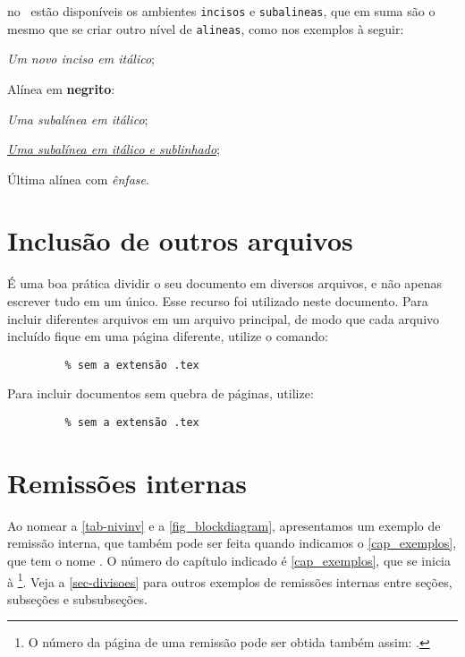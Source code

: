 \begin{alineas}
  \item no \abnTeX\ estão disponíveis os ambientes \texttt{incisos} e   \texttt{subalineas}, que em suma são o mesmo que se criar outro nível de \texttt{alineas}, como nos exemplos à seguir:
  
  \begin{incisos}
    \item \textit{Um novo inciso em itálico};
  \end{incisos}
  
  \item Alínea em \textbf{negrito}:
  
  \begin{subalineas}
    \item \textit{Uma subalínea em itálico};
    \item \underline{\textit{Uma subalínea em itálico e sublinhado}}; 
  \end{subalineas}
  
  \item Última alínea com \emph{ênfase}.
  
\end{alineas}

\section{Inclusão de outros arquivos}\label{sec-include}

É uma boa prática dividir o seu documento em diversos arquivos, e não apenas escrever tudo em um único. Esse recurso foi utilizado neste documento. Para incluir diferentes arquivos em um arquivo principal, de modo que cada arquivo incluído fique em uma página diferente, utilize o comando:

\begin{verbatim}
         % sem a extensão .tex
\end{verbatim}

Para incluir documentos sem quebra de páginas, utilize:

\begin{verbatim}
         % sem a extensão .tex
\end{verbatim}

\section{Remissões internas}

Ao nomear a \cref{tab-nivinv} e a \cref{fig_blockdiagram}, apresentamos um exemplo de remissão interna, que também pode ser feita quando indicamos o \cref{cap_exemplos}, que tem o nome \emph{}. O número do capítulo indicado é \ref{cap_exemplos}, que se inicia à \footnote{O número da página de uma remissão pode ser obtida também assim: \pageref{cap_exemplos}.}. Veja a \cref{sec-divisoes} para outros exemplos de remissões internas entre seções, subseções e subsubseções.

